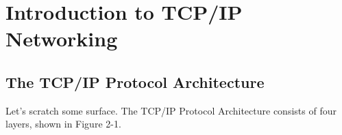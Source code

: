 \chapter{Introduction to TCP/IP Networking}
\section{The TCP/IP Protocol Architecture}
Let's scratch some surface. The TCP/IP Protocol Architecture consists of four layers, shown in Figure 2-1.